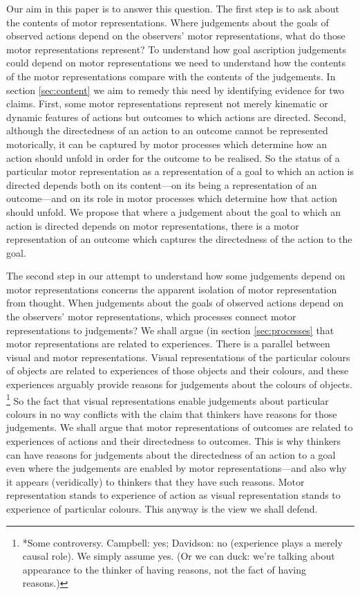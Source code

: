 \documentclass[12pt,\papersize]{extarticle}
\begin{document}
Our aim in this paper is to answer this question. 
The first step is to ask about the contents of motor representations.
Where judgements about the goals of observed actions depend on the observers' motor representations, what do those motor representations represent?
To understand how goal ascription judgements could depend on motor representations we need to understand how the contents of the motor representations compare with the contents of the judgements.
In section \vref{sec:content} we aim to remedy this need by identifying evidence for two claims. First, some motor representations represent not merely kinematic or dynamic features of actions but outcomes to which actions are directed. Second, although the directedness of an action to an outcome cannot be represented motorically, it can be captured by motor processes which determine how an action should unfold in order for the outcome to be realised. So the status of a particular motor representation as a representation of a goal to which an action is directed depends both on its content---on its being a representation of an outcome---and on its role in motor processes which determine how that action should unfold.
We propose that where a judgement about the goal to which an action is directed depends on motor representations, there is a motor representation of an outcome which captures the directedness of the action to the goal.

The second step in our attempt to understand how some judgements depend on motor representations concerns the apparent isolation of motor representation from thought. When judgements about the goals of observed actions depend on the observers' motor representations, which processes connect motor representations to judgements?
We shall argue (in section \vref{sec:processes} that motor representations are related to experiences.  There is a parallel between visual and motor representations. Visual representations of the particular colours of objects are related to experiences of those objects and their colours, and these experiences arguably provide reasons for judgements about the colours of objects.%
\footnote{
*Some controversy.  Campbell: yes; Davidson: no (experience plays a merely causal role).  We simply assume yes.  (Or we can duck: we're talking about appearance to the thinker of having reasons, not the fact of having reasons.)}
So the fact that visual representations enable judgements about particular colours in no way conflicts with the claim that thinkers have reasons for those judgements.  We shall argue that motor representations of outcomes are related to experiences of actions and their directedness to outcomes.  This is why thinkers can have reasons for judgements about the directedness of an action to a goal even where the judgements are enabled by motor representations---and also why it appears (veridically) to thinkers that they have such reasons.  Motor representation stands to experience of action as visual representation stands to experience of particular colours. This anyway is the view we shall defend.
\end{document}
